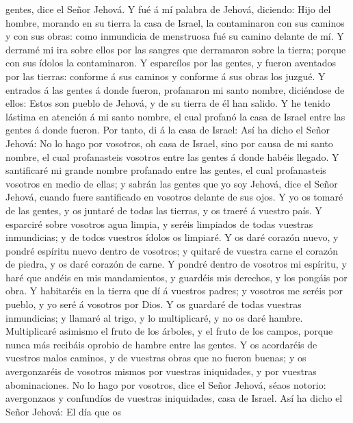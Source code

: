 gentes, dice el Señor Jehová.  Y fué á mí palabra de
Jehová, diciendo:  Hijo del hombre, morando en su tierra la
casa de Israel, la contaminaron con sus caminos y con sus obras: como
inmundicia de menstruosa fué su camino delante de mí.  Y
derramé mi ira sobre ellos por las sangres que derramaron sobre la
tierra; porque con sus ídolos la contaminaron.  Y
esparcílos por las gentes, y fueron aventados por las tierras: conforme
á sus caminos y conforme á sus obras los juzgué.  Y
entrados á las gentes á donde fueron, profanaron mi santo nombre,
diciéndose de ellos: Estos son pueblo de Jehová, y de su tierra de él
han salido.  Y he tenido lástima en atención á mi santo
nombre, el cual profanó la casa de Israel entre las gentes á donde
fueron.  Por tanto, di á la casa de Israel: Así ha dicho el
Señor Jehová: No lo hago por vosotros, oh casa de Israel, sino por causa
de mi santo nombre, el cual profanasteis vosotros entre las gentes á
donde habéis llegado.  Y santificaré mi grande nombre
profanado entre las gentes, el cual profanasteis vosotros en medio de
ellas; y sabrán las gentes que yo soy Jehová, dice el Señor Jehová,
cuando fuere santificado en vosotros delante de sus ojos. 
Y yo os tomaré de las gentes, y os juntaré de todas las tierras, y os
traeré á vuestro país.  Y esparciré sobre vosotros agua
limpia, y seréis limpiados de todas vuestras inmundicias; y de todos
vuestros ídolos os limpiaré.  Y os daré corazón nuevo, y
pondré espíritu nuevo dentro de vosotros; y quitaré de vuestra carne el
corazón de piedra, y os daré corazón de carne.  Y pondré
dentro de vosotros mi espíritu, y haré que andéis en mis mandamientos, y
guardéis mis derechos, y los pongáis por obra.  Y
habitaréis en la tierra que dí á vuestros padres; y vosotros me seréis
por pueblo, y yo seré á vosotros por Dios.  Y os guardaré
de todas vuestras inmundicias; y llamaré al trigo, y lo multiplicaré, y
no os daré hambre.  Multiplicaré asimismo el fruto de los
árboles, y el fruto de los campos, porque nunca más recibáis oprobio de
hambre entre las gentes.  Y os acordaréis de vuestros malos
caminos, y de vuestras obras que no fueron buenas; y os avergonzaréis de
vosotros mismos por vuestras iniquidades, y por vuestras abominaciones.
 No lo hago por vosotros, dice el Señor Jehová, séaos
notorio: avergonzaos y confundíos de vuestras iniquidades, casa de
Israel.  Así ha dicho el Señor Jehová: El día que os

